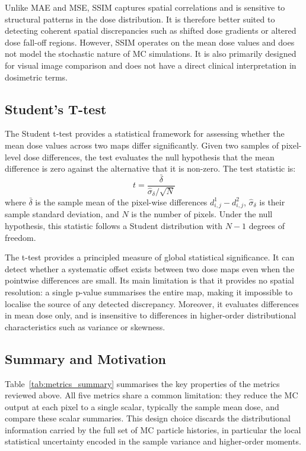 \documentclass[12pt]{article}
\begin{document}
Unlike MAE and MSE, SSIM captures spatial correlations and is sensitive to structural
patterns in the dose distribution. It is therefore better suited to detecting coherent spatial
discrepancies such as shifted dose gradients or altered dose fall-off regions. However, SSIM
operates on the mean dose values and does not model the stochastic nature of MC simulations.
It is also primarily designed for visual image comparison and does not have a direct clinical
interpretation in dosimetric terms.

\subsection{Student's T-test}

The Student t-test provides a statistical framework for assessing whether the mean dose
values across two maps differ significantly. Given two samples of pixel-level dose differences,
the test evaluates the null hypothesis that the mean difference is zero against the alternative
that it is non-zero. The test statistic is:
\begin{equation}
    t = \frac{\bar{\delta}}{\hat{\sigma}_\delta / \sqrt{N}}
\end{equation}
where $\bar{\delta}$ is the sample mean of the pixel-wise differences $d^1_{i,j} - d^2_{i,j}$,
$\hat{\sigma}_\delta$ is their sample standard deviation, and $N$ is the number of pixels. Under
the null hypothesis, this statistic follows a Student distribution with $N-1$ degrees of freedom.

The t-test provides a principled measure of global statistical significance. It can detect whether
a systematic offset exists between two dose maps even when the pointwise differences are small.
Its main limitation is that it provides no spatial resolution: a single p-value summarises the
entire map, making it impossible to localise the source of any detected discrepancy. Moreover,
it evaluates differences in mean dose only, and is insensitive to differences in higher-order
distributional characteristics such as variance or skewness.

\subsection{Summary and Motivation}

Table~\ref{tab:metrics_summary} summarises the key properties of the metrics reviewed above.
All five metrics share a common limitation: they reduce the MC output at each pixel to a
single scalar, typically the sample mean dose, and compare these scalar summaries. This
design choice discards the distributional information carried by the full set of MC particle
histories, in particular the local statistical uncertainty encoded in the sample variance and
higher-order moments.
\end{document}
